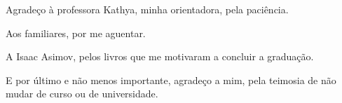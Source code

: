 \begin{agradecimentos}

Agradeço à professora Kathya, minha orientadora, pela paciência.

Aos familiares, por me aguentar.

A Isaac Asimov, pelos livros que me motivaram a concluir a graduação.   

E por último e não menos importante, agradeço a mim, pela teimosia de não 
mudar de curso ou de universidade.

\end{agradecimentos}